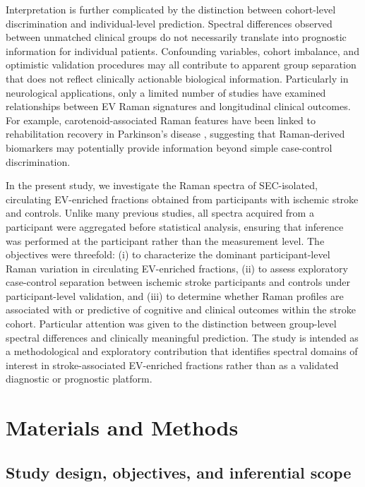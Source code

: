 \documentclass[preprint,12pt]{elsarticle}
\begin{document}
Interpretation is further complicated by the distinction between cohort-level discrimination and individual-level prediction. Spectral differences observed between unmatched clinical groups do not necessarily translate into prognostic information for individual patients. Confounding variables, cohort imbalance, and optimistic validation procedures may all contribute to apparent group separation that does not reflect clinically actionable biological information. Particularly in neurological applications, only a limited number of studies have examined relationships between EV Raman signatures and longitudinal clinical outcomes. For example, carotenoid-associated Raman features have been linked to rehabilitation recovery in Parkinson's disease \cite{gualerzi2025}, suggesting that Raman-derived biomarkers may potentially provide information beyond simple case-control discrimination.

In the present study, we investigate the Raman spectra of SEC-isolated, circulating EV-enriched fractions obtained from participants with ischemic stroke and controls. Unlike many previous studies, all spectra acquired from a participant were aggregated before statistical analysis, ensuring that inference was performed at the participant rather than the measurement level. The objectives were threefold: (i) to characterize the dominant participant-level Raman variation in circulating EV-enriched fractions, (ii) to assess exploratory case-control separation between ischemic stroke participants and controls under participant-level validation, and (iii) to determine whether Raman profiles are associated with or predictive of cognitive and clinical outcomes within the stroke cohort. Particular attention was given to the distinction between group-level spectral differences and clinically meaningful prediction. The study is intended as a methodological and exploratory contribution that identifies spectral domains of interest in stroke-associated EV-enriched fractions rather than as a validated diagnostic or prognostic platform.


\section{Materials and Methods} 
\label{sec:methods}

\subsection{Study design, objectives, and inferential scope} \label{subsec:design}
\end{document}
